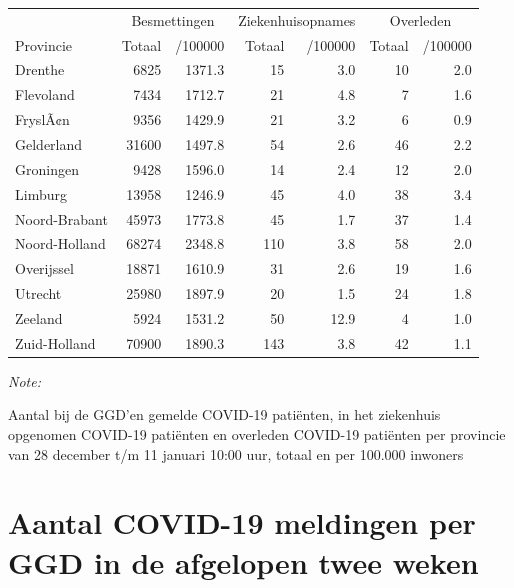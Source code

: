 \documentclass[
  english,
  man,floatsintext]{apa6}
\begin{document}
\begin{table}
\centering
\begin{threeparttable}
\begin{tabular}{lrrrrrr}
\toprule
\multicolumn{1}{c}{ } & \multicolumn{2}{c}{Besmettingen} & \multicolumn{2}{c}{Ziekenhuisopnames} & \multicolumn{2}{c}{Overleden} \\
\cmidrule(l{3pt}r{3pt}){2-3} \cmidrule(l{3pt}r{3pt}){4-5} \cmidrule(l{3pt}r{3pt}){6-7}
Provincie & Totaal & /100000 & Totaal & /100000 & Totaal & /100000\\
\midrule
Drenthe & 6825 & 1371.3 & 15 & 3.0 & 10 & 2.0\\
Flevoland & 7434 & 1712.7 & 21 & 4.8 & 7 & 1.6\\
FryslÃ¢n & 9356 & 1429.9 & 21 & 3.2 & 6 & 0.9\\
Gelderland & 31600 & 1497.8 & 54 & 2.6 & 46 & 2.2\\
Groningen & 9428 & 1596.0 & 14 & 2.4 & 12 & 2.0\\
Limburg & 13958 & 1246.9 & 45 & 4.0 & 38 & 3.4\\
Noord-Brabant & 45973 & 1773.8 & 45 & 1.7 & 37 & 1.4\\
Noord-Holland & 68274 & 2348.8 & 110 & 3.8 & 58 & 2.0\\
Overijssel & 18871 & 1610.9 & 31 & 2.6 & 19 & 1.6\\
Utrecht & 25980 & 1897.9 & 20 & 1.5 & 24 & 1.8\\
Zeeland & 5924 & 1531.2 & 50 & 12.9 & 4 & 1.0\\
Zuid-Holland & 70900 & 1890.3 & 143 & 3.8 & 42 & 1.1\\
\bottomrule
\end{tabular}
\begin{tablenotes}
\item \textit{Note: } 
\item Aantal bij de GGD’en gemelde COVID-19 patiënten, in het ziekenhuis opgenomen COVID-19 patiënten en overleden COVID-19 patiënten per provincie van 28 december t/m 11 januari 10:00 uur, totaal en per 100.000 inwoners
\end{tablenotes}
\end{threeparttable}
\end{table}

\newpage

\hypertarget{aantal-covid-19-meldingen-per-ggd-in-de-afgelopen-twee-weken}{%
\section{Aantal COVID-19 meldingen per GGD in de afgelopen twee weken}\label{aantal-covid-19-meldingen-per-ggd-in-de-afgelopen-twee-weken}}
\end{document}
